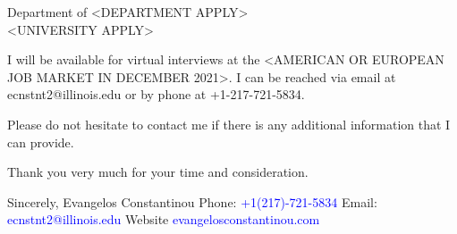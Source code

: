 \documentclass[12pt]{letter}
\begin{document}
\begin{letter}{Department of <DEPARTMENT APPLY>\\
<UNIVERSITY APPLY>}





I will be available for virtual interviews at the <AMERICAN OR EUROPEAN JOB MARKET IN DECEMBER 2021>.
I can be reached via email at ecnstnt2@illinois.edu or by phone at +1-217-721-5834.

Please do not hesitate to contact me if there is any additional information that I can provide.

Thank you very much for your time and consideration.


\noindent Sincerely,
\newline\noindent Evangelos Constantinou
\vspace{4mm}
\newline\noindent Phone: \textcolor{blue}{+1(217)-721-5834}
\newline\noindent Email: \textcolor{blue}{ecnstnt2@illinois.edu}
\newline\noindent Website \textcolor{blue}{evangelosconstantinou.com}
\end{letter}
\end{document}
